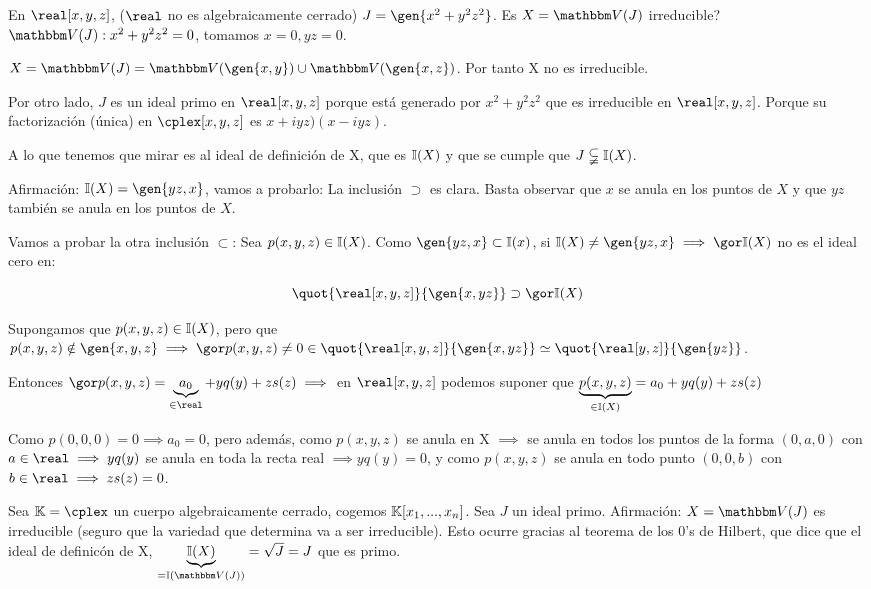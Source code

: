 \begin{example}
	En $\real[x,y,z]$, ($\real$ no es algebraicamente cerrado) $J=\gen{x^2+y^2z^2}$. Es $X=\V(J)$ irreducible? $\V(J):x^2+y^2z^2=0$, tomamos $x=0, yz=0$.

	$X=\V(J)=\V(\gen{x,y})\cup\V(\gen{x,z})$. Por tanto X no es irreducible.

	Por otro lado, $J$ es un ideal primo en $\real[x,y,z]$ porque está generado por $x^2+y^2z^2$ que es irreducible en $\real[x,y,z]$. Porque su factorización (única) en $\cplex[x,y,z]$ es $x+iyz)(x-iyz)$.

	A lo que tenemos que mirar es al ideal de definición de X, que es $\mathbb{I}(X)$ y que se cumple que $J \subsetneqq \mathbb{I}(X)$.

	Afirmación: $ \I(X)=\gen{yz,x}$, vamos a probarlo:
	La inclusión $\supset$ es clara. Basta observar que $x$ se anula en los puntos de $X$ y que $yz$ también se anula en los puntos de $X$.

	Vamos a probar la otra inclusión $\subset$: Sea $p(x,y,z) \in \mathbb{I}(X)$. Como $\gen{yz,x} \subset \I(x)$, si $\I(X) \neq \gen{yz,x} \implies \cls{\I(X)}$ no es el ideal cero en:

	$$ \quot{\real[x,y,z]}{\gen{x,yz}} \supset \cls{\I(X)} $$

	Supongamos que $p(x,y,z) \in \mathbb{I}(X)$, pero que $p(x,y,z) \notin \gen{x,y,z} \implies \cls{p(x,y,z)} \neq 0 \in \quot{\real[x,y,z]}{\gen{x,yz}} \simeq \quot{\real[y,z]}{\gen{yz}}$.

	Entonces $\cls{p(x,y,z)}=\underbrace{a_0}_{\in \real}+yq(y)+zs(z) \implies$ en $\real[x,y,z]$ podemos suponer que $\underbrace{p(x,y,z)}_{\in \mathbb{I}(X)}=a_0+yq(y)+zs(z)$

	Como $p(0,0,0)=0 \implies a_0=0$, pero además, como $p(x,y,z)$ se anula en X $\implies$ se anula en todos los puntos de la forma $(0,a,0)$ con $a\in \real \implies yq(y)$ se anula en toda la recta real $\implies yq(y)=0$, y como $p(x,y,z)$ se anula en todo punto $(0,0,b)$ con $b\in \real \implies zs(z)=0$.
\end{example}


\begin{example}
	Sea $\K=\cplex$ un cuerpo algebraicamente cerrado, cogemos $\mathbb{K}[x_1,...,x_n]$. Sea $J$ un ideal primo. Afirmación: $X=\V(J)$ es irreducible (seguro que la variedad que determina va a ser irreducible). Esto ocurre gracias al teorema de los 0's de Hilbert, que dice que el ideal de definicón de X, $\underbrace{\I(X)}_{=\I(\V(J))}=\sqrt{J}=J$ que es primo.
\end{example}

